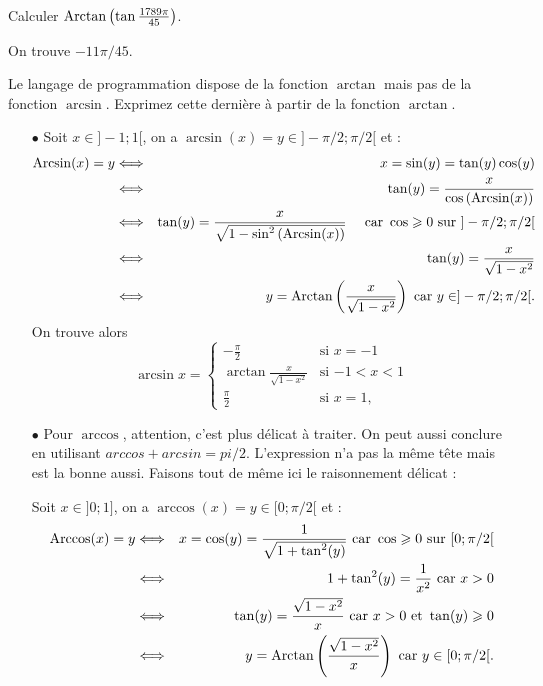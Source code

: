 \documentclass{magnolia}
\begin{document}
\begin{exos}
\exemple Calculer $\operatorname{Arctan}\left(\tan\frac{1789\pi}{45}\right)$.
  \begin{sol}
  On trouve $-11\pi/45$.
  \end{sol}
\exemple Le langage de programmation  dispose de la fonction
  $\arctan$ mais pas de la fonction $\arcsin$. Exprimez cette
  dernière à partir de la fonction $\arctan$.
  \begin{sol}
  \begin{itemize}
  \item[$\bullet$]
  Soit $x\in ]-1;1[$, on a $\arcsin(x)=y \in ]-\pi/2;\pi/2[$ et :
  \begin{eqnarray*}
  \operatorname{Arcsin}(x)=y &\Longleftrightarrow & x=\sin(y)=\tan(y)\cos(y) \\
&\Longleftrightarrow & \tan(y)=\dfrac{x}{\cos\left(\operatorname{Arcsin}(x)\right)}\\
&\Longleftrightarrow & \tan(y)=\dfrac{x}{\sqrt{1-\sin^2\left(\operatorname{Arcsin}(x)\right)}} \quad \text{ car } \cos\geqslant 0 \text{ sur } ]-\pi/2;\pi/2[\\
&\Longleftrightarrow & \tan(y)=\frac{x}{\sqrt{1-x^2}}\\
&\Longleftrightarrow & y=\operatorname{Arctan}\left(\frac{x}{\sqrt{1-x^2}}\right) \text{ car } y\in ]-\pi/2;\pi/2[.
  \end{eqnarray*}
  On trouve alors
  \[\arcsin x=
    \begin{cases}
    -\frac{\pi}{2} & \text{si $x=-1$}\\
    \arctan\frac{x}{\sqrt{1-x^2}} & \text{si $-1<x<1$}\\
    \frac{\pi}{2} & \text{si $x=1$,}
    \end{cases}\]
    
    \item[$\bullet$]
    Pour $\arccos$, attention, c'est plus délicat à traiter. On peut aussi conclure en utilisant $arccos+arcsin=pi/2$. L'expression n'a pas la même tête mais est la bonne aussi.
    Faisons tout de même ici le raisonnement délicat :
    
    Soit $x\in ]0;1]$, on a $\arccos(x)=y \in [0;\pi/2[$ et :
  \begin{eqnarray*}
  \operatorname{Arccos}(x)=y &\Longleftrightarrow & x=\cos(y)=\dfrac{1}{\sqrt{1+\tan^2(y)}} \text{ car } \cos\geqslant 0 \text{ sur } [0;\pi/2[\\
&\Longleftrightarrow & 1+\tan^2(y)=\dfrac{1}{x^2} \text{ car } x>0\\
&\Longleftrightarrow & \tan(y)=\frac{\sqrt{1-x^2}}{x} \text{ car } x>0 \text{ et } \tan(y)\geqslant 0\\
&\Longleftrightarrow & y=\operatorname{Arctan}\left(\frac{\sqrt{1-x^2}}{x}\right) \text{ car } y\in [0;\pi/2[.
  \end{eqnarray*}
  

\end{itemize}
\end{sol}
\end{exos}
\end{document}
